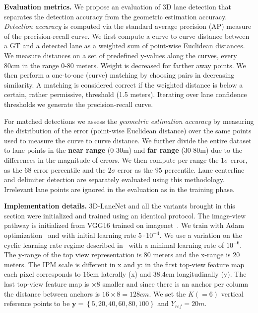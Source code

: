\documentclass[10pt,twocolumn,letterpaper]{article}
\begin{document}
\textbf{Evaluation metrics.} We propose an evaluation of 3D lane detection that separates the detection accuracy from the geometric estimation accuracy. \textit{Detection accuracy} is computed via the standard average precision (AP) measure of the precision-recall curve. We first compute a curve to curve distance between a GT and a detected lane as a weighted sum of point-wise Euclidean distances. We measure distances on a set of predefined y-values along the curves, every 80cm in the range 0-80 meters. Weight is decreased for farther away points. We then perform a one-to-one (curve) matching by choosing pairs in decreasing similarity. A matching is considered correct if the weighted distance is below a certain, rather permissive, threshold (1.5 meters). Iterating over lane confidence thresholds we generate the precision-recall curve.

For matched detections we assess the \textit{geometric estimation accuracy} by measuring the distribution of the error (point-wise Euclidean distance) over the same points used to measure the curve to curve distance. We further divide the entire dataset to lane points in the \textbf{near range} (0-30m) and \textbf{far range} (30-80m) due to the differences in the magnitude of errors. We then compute per range the $1\sigma$ error, as the $68$ error percentile and the $2\sigma$ error as the $95$ percentile. Lane centerline and delimiter detection are separately evaluated using this methodology. Irrelevant lane points are ignored in the evaluation as in the training phase.

\textbf{Implementation details.} 3D-LaneNet and all the variants brought in this section were initialized and trained using an identical protocol. The image-view pathway is initialized from VGG16 trained on imagenet~\cite{imagenet_cvpr09}. We train with Adam optimization~\cite{adam} and with initial learning rate $5\cdot 10^{-4}$. We use a variation on the cyclic learning rate regime described in~\cite{cyclic_lr} with a minimal learning rate of $10^{-6}$. The y-range of the top view representation is 80 meters and the x-range is 20 meters. The IPM scale is different in x and y: in the first top-view feature map each pixel corresponds to 16cm laterally (x) and 38.4cm longitudinally (y). The last top-view feature map is $\times 8$ smaller and since there is an anchor per column the distance between anchors is $16\times8=128cm$. We set the $K(=6)$ vertical reference points to be $\mathbf{y}=\left\lbrace5,20,40,60,80,100 \right\rbrace$ and $Y_{ref}=20m$. 
\end{document}
